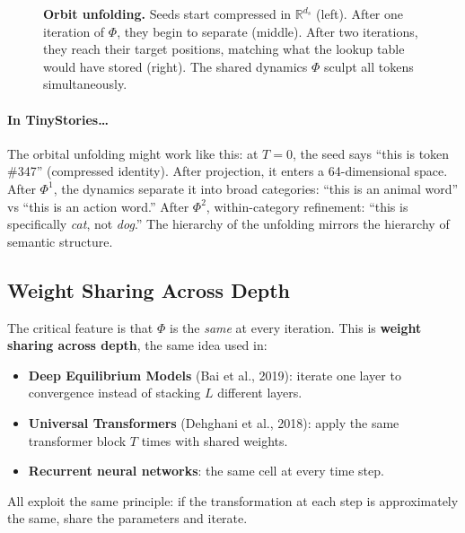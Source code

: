 \documentclass[11pt, a4paper]{article}
\newcommand{\R}{\mathbb{R}}
\theoremstyle{remark}
\begin{document}
\begin{figure}[h]
\caption{\textbf{Orbit unfolding.}
Seeds start compressed in $\R^{d_s}$ (left).
After one iteration of $\Phi$, they begin to separate (middle).
After two iterations, they reach their target positions, matching what the lookup table would have stored (right).
The shared dynamics $\Phi$ sculpt all tokens simultaneously.}
\label{fig:orbit-unfolding}
\end{figure}

\paragraph{In TinyStories\ldots}
The orbital unfolding might work like this: at $T = 0$, the seed says ``this is token \#347'' (compressed identity).
After projection, it enters a 64-dimensional space.
After $\Phi^1$, the dynamics separate it into broad categories: ``this is an animal word'' vs ``this is an action word.''
After $\Phi^2$, within-category refinement: ``this is specifically \emph{cat}, not \emph{dog}.''
The hierarchy of the unfolding mirrors the hierarchy of semantic structure.

\subsection{Weight Sharing Across Depth}

The critical feature is that $\Phi$ is the \emph{same} at every iteration.
This is \textbf{weight sharing across depth}, the same idea used in:
\begin{itemize}[nosep]
    \item \textbf{Deep Equilibrium Models} (Bai et al., 2019): iterate one layer to convergence instead of stacking $L$ different layers.
    \item \textbf{Universal Transformers} (Dehghani et al., 2018): apply the same transformer block $T$ times with shared weights.
    \item \textbf{Recurrent neural networks}: the same cell at every time step.
\end{itemize}
All exploit the same principle: if the transformation at each step is approximately the same, share the parameters and iterate.
\end{document}

